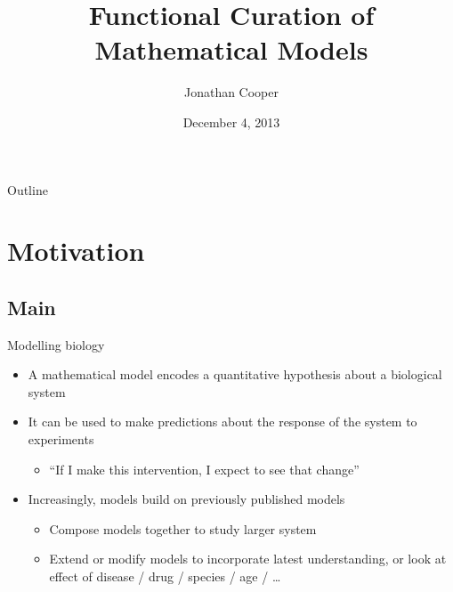 \documentclass[t,xcolor={usenames,dvipsnames}]{beamer}
\title{Functional Curation of Mathematical Models}
\author{Jonathan Cooper}
\institute[University of Oxford]
{Computational Biology Group\\
 Department of Computer Science\\
 University of Oxford}
\date{December 4, 2013}
\newcommand{\subitem}[1]{\begin{itemize}[<.->]\item #1 \end{itemize}}
\begin{document}
\begin{frame}
\titlepage
\end{frame}

\begin{frame}{Outline}
\setcounter{tocdepth}{1}
\tableofcontents
\end{frame}

\section{Motivation}
\subsection*{Main}

\begin{frame}{Modelling biology}
\begin{itemize}[<+->]
\item A mathematical model encodes a quantitative hypothesis about a biological system
\item It can be used to make predictions about the response of the system to experiments
  \subitem{``If I make this intervention, I expect to see that change''}
\item Increasingly, models build on previously published models
  \begin{itemize}
  \item Compose models together to study larger system
  \item Extend or modify models to incorporate latest understanding, or look at effect of disease / drug / species / age / \ldots
  \end{itemize}
\end{itemize}
\end{frame}
\end{document}
